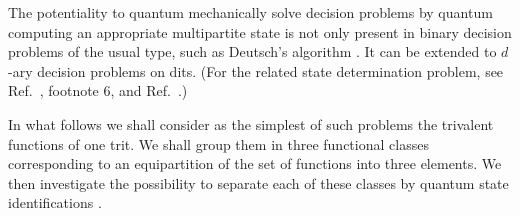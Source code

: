 \documentclass[pra,amsfonts,showpacs,showkeys,preprint]{revtex4}
\begin{document}
The potentiality to quantum mechanically solve decision problems
by quantum computing an appropriate multipartite state is not only present in binary decision problems of the usual type,
such as Deutsch's algorithm \cite{deutsch,deutsch:92,cleve:98,nielsen-book,mermin-07}.
It can be extended to $d$-ary decision problems on dits. (For the related state determination problem,
see  Ref.~\cite{zeil-99}, footnote 6,
and Ref.~\cite{svozil-2002-statepart-prl}.)


In what follows we shall consider as the simplest of such problems
the trivalent functions of one trit.
We shall group them in three functional classes
corresponding to an equipartition of the set of functions into three elements.
We then investigate
the possibility to separate each of these classes by
quantum state identifications \cite{DonSvo01,svozil-2002-statepart-prl}.
\end{document}
